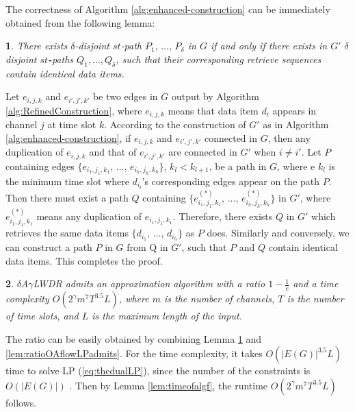 \documentclass[11pt,english,onecolumn,draftcls]{IEEEtran}
\theoremstyle{plain}
\newtheorem{thm}{\protect\theoremname}
\theoremstyle{plain}
\theoremstyle{plain}
\newtheorem{lem}[thm]{\protect\lemmaname}
\theoremstyle{plain}
\providecommand{\lemmaname}{Lemma}
\providecommand{\theoremname}{Theorem}
\begin{document}
The correctness of Algorithm \ref{alg:enhanced-construction} can
be immediately obtained from the following lemma:
\begin{lem}
\label{lem:finalgra}There exists $\delta$-disjoint $st$-path $P_{1},\,\dots,\, P_{\delta}$
in $G$ if and only if there exists in $G'$ $\delta$ disjoint \textbf{$st$-}paths
$Q_{1},\dots,Q_{\delta}$, such that their corresponding retrieve
sequences\textbf{ }contain identical data items.\end{lem}
\begin{IEEEproof}
Let $e_{i,j,k}$ and $e_{i',j',k'}$ be two edges in $G$ output by
Algorithm \ref{alg:RefinedConstruction}, where $e_{i,j,k}$ means
that data item $d_{i}$ appears in channel $j$ at time slot $k$.
According to the construction of $G'$ as in Algorithm \ref{alg:enhanced-construction},
if $e_{i,j,k}$ and $e_{i',j',k'}$ connected in $G$, then any duplication
of $e_{i,j,k}$ and that of $e_{i',j',k'}$ are connected in $G'$
when $i\neq i'$. Let $P$ containing edges $\{e_{i_{1},j_{1},k_{1}},\,\dots,\, e_{i_{h},j_{h},k_{h}}\}$,
$k_{l}<k_{l+1}$, be a path in $G$, where e $k_{l}$ is the minimum
time slot where $d_{i_{l}}$'s corresponding edges appear on the path
$P$. Then there must exist a path $Q$ containing $\{e_{i_{1},j_{1},k_{1}}^{(*)},\,\dots,\, e_{i_{h},j_{h},k_{h}}^{(*)}\}$
in $G'$, where $e_{i_{1},j_{1},k_{1}}^{(*)}$ means any duplication
of $e_{i_{1},j_{1},k_{1}}$. Therefore, there exists $Q$ in $G'$
which retrieves the same data items $\{d_{i_{1}},\,\dots,\, d_{i_{h}}\}$
as $P$ does. Similarly and conversely, we can construct a path $P$
in $G$ from Q in $G'$, such that $P$ and $Q$ contain identical
data items. This completes the proof. \end{IEEEproof}
\begin{thm}
\label{thr:kagammaLWDR} $\delta$A$\gamma$LWDR admits an approximation
algorithm with a ratio $1-\frac{1}{e}$ and a time complexity $O(2^{\gamma}m^{7}T^{3.5}L)$,
where $m$ is the number of channels, $T$ is the number of time slots,
and $L$ is the maximum length of the input.\end{thm}
\begin{IEEEproof}
The ratio can be easily obtained by combining Lemma \ref{lem:finalgra}
and \ref{lem:ratioOAflowLPadmits}. For the time complexity, it takes
$O(\vert E(G)\vert^{3.5}L)$ time to solve LP (\ref{eq:thedualLP}),
since the number of the constraints is $O(\vert E(G)\vert)$ \cite{korte2002combinatorial}.
Then by Lemma \ref{lem:timeofalgf}, the runtime $O(2^{\gamma}m^{7}T^{3.5}L)$
follows.
\end{IEEEproof}
\end{document}
